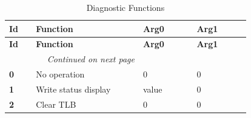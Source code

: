 
\begin{longtable}{@{}p{0.1\linewidth}p{0.4\linewidth}p{0.2\linewidth}p{0.2\linewidth}@{}}
    \caption{Diagnostic Functions} \\
    \toprule
    \textbf{Id} & \textbf{Function} & \textbf{Arg0} & \textbf{Arg1} \\
    \midrule
    \endfirsthead
    \toprule
    \textbf{Id} & \textbf{Function} & \textbf{Arg0} & \textbf{Arg1} \\
    \midrule
    \endhead
    \midrule
    \multicolumn{2}{r}{\textit{Continued on next page}} \\
    \midrule
    \endfoot
    \bottomrule
    \endlastfoot
    \textbf{0} & No operation & 0 & 0 \\
    \midrule
    \textbf{1} & Write status display & value & 0 \\
    \midrule
    \textbf{2} & Clear TLB & 0 & 0 \\
    \bottomrule
\end{longtable}


